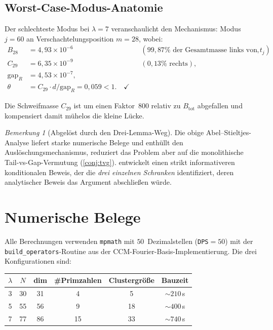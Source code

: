\documentclass[12pt,a4paper]{article}
\theoremstyle{definition}
\theoremstyle{remark}
\newtheorem{remark}[theorem]{Bemerkung}
\begin{document}
\subsection{Worst-Case-Modus-Anatomie}

Der schlechteste Modus bei $\lambda = 7$ veranschaulicht den Mechanismus:
Modus $j = 60$ an Verschachtelungsposition $m = 28$, wobei:
\begin{align*}
B_{28} &= 4{,}93 \times 10^{-6} && (99{,}87\% \text{ der Gesamtmasse links von } t_j), \\
C_{29} &= 6{,}35 \times 10^{-9} && (0{,}13\% \text{ rechts}), \\
\text{gap}_R &= 4{,}53 \times 10^{-7}, \\
\theta &= C_{29} \cdot d / \text{gap}_R = 0{,}059 < 1. \quad \checkmark
\end{align*}

Die Schweifmasse $C_{29}$ ist um einen Faktor~$800$ relativ zu $B_{\mathrm{tot}}$
abgefallen und kompensiert damit mühelos die kleine Lücke.

\begin{remark}[Abgelöst durch den Drei-Lemma-Weg]
Die obige Abel--Stieltjes-Analyse liefert starke numerische Belege
und enthüllt den Auslöschungsmechanismus, reduziert das Problem aber auf die
monolithische Tail-vs-Gap-Vermutung (\cref{conj:tvg}).
 entwickelt einen strikt informativeren konditionalen
Beweis, der die \emph{drei einzelnen Schranken} identifiziert, deren
analytischer Beweis das Argument abschließen würde.
\end{remark}

\section{Numerische Belege}
\label{sec:numerics}

Alle Berechnungen verwenden \texttt{mpmath} mit $50$~Dezimalstellen
(\texttt{DPS}$=50$) mit der \texttt{build\_operators}-Routine
aus der CCM-Fourier-Basis-Implementierung.
Die drei Konfigurationen sind:

\begin{center}
\begin{tabular}{cccccc}
\toprule
$\lambda$ & $N$ & dim & \#Primzahlen & Clustergröße & Bauzeit \\
\midrule
3 & 30 & 31 & 4 & 5 & $\sim 210$\,s \\
5 & 55 & 56 & 9 & 18 & $\sim 400$\,s \\
7 & 77 & 86 & 15 & 33 & $\sim 740$\,s \\
\bottomrule
\end{tabular}
\end{center}
\end{document}
